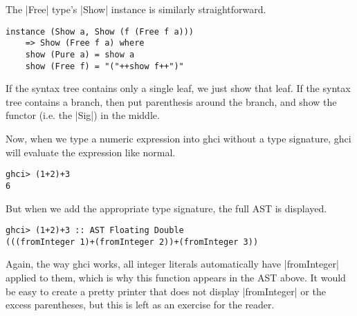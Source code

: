 \documentclass[preprint]{sigplanconf}
\theoremstyle{definition}
\begin{document}
The |Free| type's |Show| instance is similarly straightforward.
\begin{lstlisting}
instance (Show a, Show (f (Free f a)))
    => Show (Free f a) where
    show (Pure a) = show a
    show (Free f) = "("++show f++")"
\end{lstlisting}
If the syntax tree contains only a single leaf, we just show that leaf.
If the syntax tree contains a branch,
then put parenthesis around the branch,
and show the functor (i.e. the |Sig|) in the middle.

Now, when we type a numeric expression into ghci without a type signature,
ghci will evaluate the expression like normal.
\begin{lstlisting}
ghci> (1+2)+3
6
\end{lstlisting}
But when we add the appropriate type signature,
the full AST is displayed.
\begin{lstlisting}
ghci> (1+2)+3 :: AST Floating Double
(((fromInteger 1)+(fromInteger 2))+(fromInteger 3))
\end{lstlisting}
Again, the way ghci works, all integer literals automatically have |fromInteger| applied to them,
which is why this function appears in the AST above.
It would be easy to create a pretty printer that does not display |fromInteger| or the excess parentheses,
but this is left as an exercise for the reader.
\end{document}
